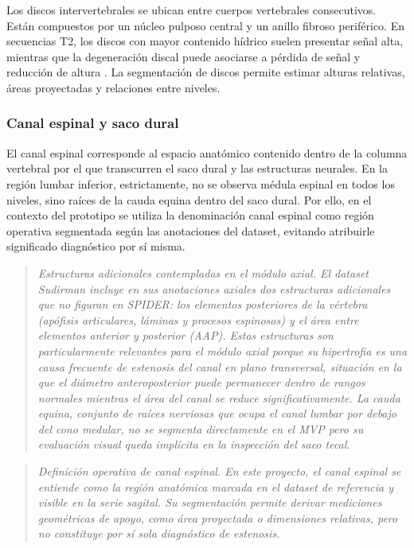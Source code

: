 Los discos intervertebrales se ubican entre cuerpos vertebrales consecutivos. Están compuestos por un núcleo pulposo central y un anillo fibroso periférico. En secuencias T2, los discos con mayor contenido hídrico suelen presentar señal alta, mientras que la degeneración discal puede asociarse a pérdida de señal y reducción de altura \parencite{modic_disk_1988}. La segmentación de discos permite estimar alturas relativas, áreas proyectadas y relaciones entre niveles.

\subsubsection{Canal espinal y saco dural}

El canal espinal corresponde al espacio anatómico contenido dentro de la columna vertebral por el que transcurren el saco dural y las estructuras neurales. En la región lumbar inferior, estrictamente, no se observa médula espinal en todos los niveles, sino raíces de la cauda equina dentro del saco dural. Por ello, en el contexto del prototipo se utiliza la denominación canal espinal como región operativa segmentada según las anotaciones del dataset, evitando atribuirle significado diagnóstico por sí misma.

\begin{quote}
\itshape
Estructuras adicionales contempladas en el módulo axial. El dataset Sudirman incluye en sus anotaciones axiales dos estructuras adicionales que no figuran en SPIDER: los elementos posteriores de la vértebra (apófisis articulares, láminas y procesos espinosos) y el área entre elementos anterior y posterior (AAP). Estas estructuras son particularmente relevantes para el módulo axial porque su hipertrofia es una causa frecuente de estenosis del canal en plano transversal, situación en la que el diámetro anteroposterior puede permanecer dentro de rangos normales mientras el área del canal se reduce significativamente. La cauda equina, conjunto de raíces nerviosas que ocupa el canal lumbar por debajo del cono medular, no se segmenta directamente en el MVP pero su evaluación visual queda implícita en la inspección del saco tecal.
\end{quote}

\begin{quote}
\itshape
Definición operativa de canal espinal. En este proyecto, el canal espinal se entiende como la región anatómica marcada en el dataset de referencia y visible en la serie sagital. Su segmentación permite derivar mediciones geométricas de apoyo, como área proyectada o dimensiones relativas, pero no constituye por sí sola diagnóstico de estenosis.
\end{quote}

